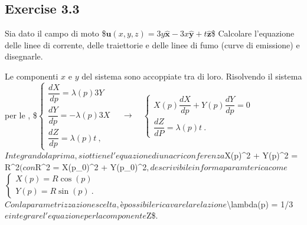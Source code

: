 \documentclass[letterpaper,10pt,italian]{jupyterBook}
\begin{document}
\subsection{Exercise 3.3}
\label{\detokenize{polimi/fluidmechanics-ita/template/capitoli/03_cinematica/1204in_hints:exercise-3-3}}\label{\detokenize{polimi/fluidmechanics-ita/template/capitoli/03_cinematica/1204in_hints:fluid-mechanics-kinematics-ex-03}}\label{\detokenize{polimi/fluidmechanics-ita/template/capitoli/03_cinematica/1204in_hints::doc}}
\sphinxAtStartPar
Sia dato il campo di moto
\$\(\bm{u}(x,y,z) = 3y \bm{\hat{x}} - 3x \bm{\hat{y}} +t\bm{\hat{z}}\)\$
Calcolare l’equazione delle linee di corrente, delle traiettorie e delle
linee di fumo (curve di emissione) e disegnarle.

\sphinxAtStartPar
{} Le componenti \(x\) e \(y\) del sistema sono accoppiate
tra di loro. Risolvendo il sistema per le ,
\$\(\begin{cases}
  \dfrac{dX}{dp} =  \lambda(p) 3Y \\
  \dfrac{dY}{dp} = -\lambda(p) 3X \\
  \dfrac{dZ}{dp} =  \lambda(p) t \ ,
 \end{cases}
\quad \rightarrow \quad
 \begin{cases}
  X(p) \dfrac{dX}{dp} + Y(p) \dfrac{dY}{dp} = 0 \\
  \dfrac{dZ}{dP} = \lambda(p) t \ .
 \end{cases}\)\( Integrando la prima, si ottiene l'equazione di una
criconferenza \)X(p)\textasciicircum{}2 + Y(p)\textasciicircum{}2 = R\textasciicircum{}2\( (con \)R\textasciicircum{}2 = X(p\_0)\textasciicircum{}2 + Y(p\_0)\textasciicircum{}2\(,
descrivibile in forma paramterica come \)\(\begin{cases}
 X(p) = R \cos(p) \\
 Y(p) = R \sin(p) \ .
 \end{cases}\)\( Con la parametrizzazione scelta, è possibile ricavare la
relazione \)\textbackslash{}lambda(p) = \sphinxhyphen{}1/3\( e integrare l'equazione per la componente
\)Z\$.
\end{document}
